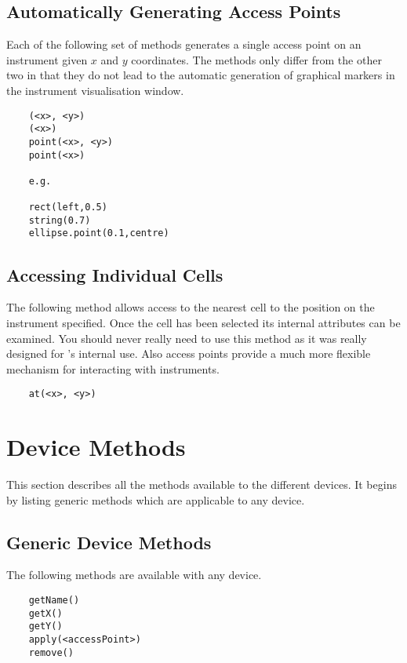 \subsection{Automatically Generating Access Points}
Each of the following set of methods generates a single access point
on an instrument given $x$ and $y$ coordinates. The 
methods only differ from the other two in that they do not lead to the
automatic generation of graphical markers in the instrument
visualisation window.

\begin{verbatim}
    (<x>, <y>)
    (<x>)
    point(<x>, <y>)
    point(<x>)

    e.g.

    rect(left,0.5)
    string(0.7)
    ellipse.point(0.1,centre)
\end{verbatim}

\subsection{Accessing Individual Cells}
The following method allows access to the nearest cell to the
position on the instrument specified. Once the cell has been
selected its internal attributes can be examined. You should
never really need to use this method as it was really designed
for \tao's internal use. Also access points provide a much
more flexible mechanism for interacting with instruments.

\begin{verbatim}
    at(<x>, <y>)
\end{verbatim}

\section{Device Methods}
This section describes all the methods available to the different
devices. It begins by listing generic methods which are applicable
to any device.

\subsection{Generic Device Methods}
The following methods are available with any device.

\begin{verbatim}
    getName()
    getX()
    getY()
    apply(<accessPoint>)
    remove()
\end{verbatim}

